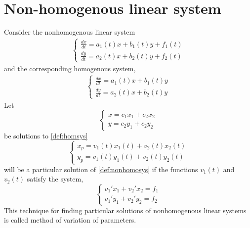 \documentclass[oneside,11pt,pdftex,final]{book}%
\numberwithin{equation}{section}
\numberwithin{section}{chapter}
\numberwithin{equation}{chapter}
\begin{document}
\section{Non-homogenous linear system}
Consider the nonhomogenous linear system
\begin{align}\label{def:nonhomosys}
	\begin{cases}
	\frac{dx}{dt}=a_1(t)x+b_1(t)y+f_1(t)\\
	\frac{dy}{dt}=a_2(t)x+b_2(t)y+f_2(t)
\end{cases}
\end{align}
and the corresponding homogenous system,
\begin{align} \label{def:homsys}
	\begin{cases}
		\frac{dx}{dt}=a_1(t)x+b_1(t)y\\
		\frac{dy}{dt}=a_2(t)x+b_2(t)y
	\end{cases}
\end{align} 
Let \[ \begin{cases}
	x=c_1x_1+c_2x_2\\
	y=c_2y_1+c_2y_2
\end{cases} \]
be solutions to \ref{def:homsys}
\[ \begin{cases}
	x_p=v_1(t)x_1(t)+v_2(t)x_2(t)\\
	y_p=v_1(t)y_1(t)+v_2(t)y_2(t)
\end{cases} \]
will be a particular solution of \ref{def:nonhomosys} if the functions $ v_1(t) $ and $ v_2(t) $ satisfy the system,
\[ \begin{cases}
	v_1'x_1+v_2'x_2=f_1\\
	v_1'y_1+v_2'y_2=f_2
\end{cases} \]
This technique for finding particular solutions of nonhomogenous linear systems is called method of variation of parameters.
\end{document}
